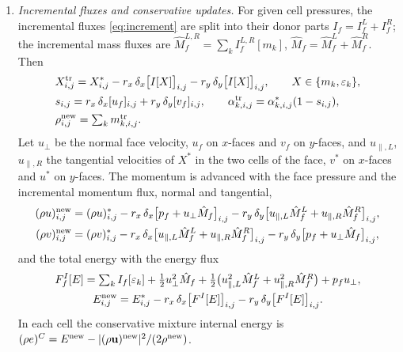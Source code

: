 \documentclass[a4paper,fleqn]{cas-sc}
\begin{document}
\begin{enumerate}
ghost cells take the pressure of the adjacent cell, or the given pressure at the outlet of Sec.~\ref{sec:res_bartak}, and their state is a copy of the boundary cells at transmissive
boundaries and their mirror image at walls, with the normal velocity $2u_w-u$ for a wall velocity $u_w$; on a wall face $u_f=u_w$. At periodic boundaries the ghost cells and their pressures are those of the opposite side.
\item \emph{Incremental fluxes and conservative updates.} For given cell pressures, the incremental fluxes
\eqref{eq:increment} are split into their donor parts $I_f=I^L_f+I^R_f$; the incremental mass fluxes are
$\hat M^{L,R}_f=\sum_kI^{L,R}_f[m_k]$, $\hat M_f=\hat M^L_f+\hat M^R_f$. Then
\[
\begin{aligned}
&X^{\rm tr}_{i,j}=X^*_{i,j}-r_x\,\delta_x\big[I[X]\big]_{i,j}-r_y\,\delta_y\big[I[X]\big]_{i,j},\qquad X\in\{m_k,\varepsilon_k\},\\
&s_{i,j}=r_x\,\delta_x[u_f]_{i,j}+r_y\,\delta_y[v_f]_{i,j},\qquad \alpha^{\rm tr}_{k,i,j}=\alpha^*_{k,i,j}(1-s_{i,j}),\\
&\rho^{\rm new}_{i,j}=\textstyle\sum_km^{\rm tr}_{k,i,j}.
\end{aligned}
\]
Let $u_\perp$ be the normal face velocity, $u_f$ on $x$-faces and $v_f$ on $y$-faces, and $u_{\parallel,L}$, $u_{\parallel,R}$ the tangential velocities
of $X^*$ in the two cells of the face, $v^*$ on $x$-faces and $u^*$ on $y$-faces. The momentum is advanced with the face
pressure and the incremental momentum flux, normal and tangential,
\[
\begin{aligned}
(\rho u)^{\rm new}_{i,j}&=(\rho u)^*_{i,j}-r_x\,\delta_x\big[p_f+u_\perp\hat M_f\big]_{i,j}-r_y\,\delta_y\big[u_{\parallel,L}\hat M^L_f+u_{\parallel,R}\hat M^R_f\big]_{i,j},\\
(\rho v)^{\rm new}_{i,j}&=(\rho v)^*_{i,j}-r_x\,\delta_x\big[u_{\parallel,L}\hat M^L_f+u_{\parallel,R}\hat M^R_f\big]_{i,j}-r_y\,\delta_y\big[p_f+u_\perp\hat M_f\big]_{i,j},
\end{aligned}
\]
and the total energy with the energy flux
\[
\begin{gathered}
F^I_f[E]=\textstyle\sum_kI_f[\varepsilon_k]+\tfrac12u_\perp^2\hat M_f+\tfrac12\big(u_{\parallel,L}^2\hat M^L_f+u_{\parallel,R}^2\hat M^R_f\big)+p_fu_\perp ,\\
E^{\rm new}_{i,j}=E^*_{i,j}-r_x\,\delta_x\big[F^I[E]\big]_{i,j}-r_y\,\delta_y\big[F^I[E]\big]_{i,j}.
\end{gathered}
\]
In each cell the conservative mixture internal energy is $(\rho e)^C=E^{\rm new}-|(\rho\mathbf u)^{\rm new}|^2/(2\rho^{\rm new})$.

\end{enumerate}
\end{document}
